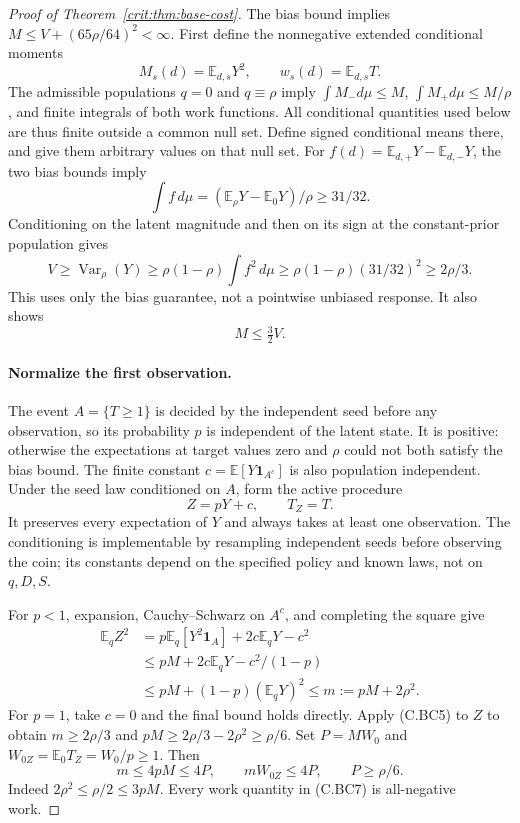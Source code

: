 \begin{proof}[Proof of Theorem~\ref{crit:thm:base-cost}]
The bias bound implies $M\le V+(65\rho/64)^2<\infty$.
First define the nonnegative extended conditional moments
\[
 M_s(d)=\mathbb E_{d,s}Y^2,\qquad w_s(d)=\mathbb E_{d,s}T.
\]
The admissible populations $q=0$ and $q\equiv\rho$ imply
$\int M_-d\mu\le M$, $\int M_+d\mu\le M/\rho$, and finite
integrals of both work functions. All conditional quantities used below
are thus finite outside a common null set. Define signed conditional
means there, and give them arbitrary values on that null set. For
$f(d)=\mathbb E_{d,+}Y-\mathbb E_{d,-}Y$, the two bias bounds imply
\[
 \int f\,d\mu=(\mathbb E_\rho Y-\mathbb E_0Y)/\rho\ge31/32.
\]
Conditioning on the latent magnitude and then on its sign at the
constant-prior population gives
\[
 V\ge\operatorname{Var}_\rho(Y)
 \ge\rho(1-\rho)\int f^2\,d\mu
 \ge\rho(1-\rho)(31/32)^2\ge2\rho/3.                   \tag{C.BC5}
\]
This uses only the bias guarantee, not a pointwise unbiased response.
It also shows
\[
                        M\le\tfrac32 V.               \tag{C.BC6}
\]

\paragraph{Normalize the first observation.}
The event $A=\{T\ge1\}$ is decided by the independent seed before any
observation, so its probability $p$ is independent of the latent state.
It is positive: otherwise the expectations at target values zero and
$\rho$ could not both satisfy the bias bound. The finite constant
$c=\mathbb E[Y\mathbf1_{A^c}]$ is also population independent. Under
the seed law conditioned on $A$, form the active procedure
\[
                  Z=pY+c,\qquad T_Z=T.
\]
It preserves every expectation of $Y$ and always takes at least one
observation. The conditioning is implementable by resampling independent
seeds before observing the coin; its constants depend on the specified
policy and known laws, not on $q,D,S$.

For $p<1$, expansion, Cauchy--Schwarz on $A^c$, and completing the square
give
\begin{align*}
 \mathbb E_qZ^2
 &=p\mathbb E_q[Y^2\mathbf1_A]+2c\mathbb E_qY-c^2\\
 &\le pM+2c\mathbb E_qY-c^2/(1-p)\\
 &\le pM+(1-p)(\mathbb E_qY)^2
 \le m:=pM+2\rho^2.
\end{align*}
For $p=1$, take $c=0$ and the final bound holds directly. Apply (C.BC5) to
$Z$ to obtain $m\ge2\rho/3$ and
$pM\ge2\rho/3-2\rho^2\ge\rho/6$. Set
$P=MW_0$ and $W_{0Z}=\mathbb E_0T_Z=W_0/p\ge1$. Then
\[
 m\le4pM\le4P,\qquad mW_{0Z}\le4P,
 \qquad P\ge\rho/6.                                   \tag{C.BC7}
\]
Indeed $2\rho^2\le\rho/2\le3pM$. Every work quantity in (C.BC7) is
all-negative work.


\end{proof}
